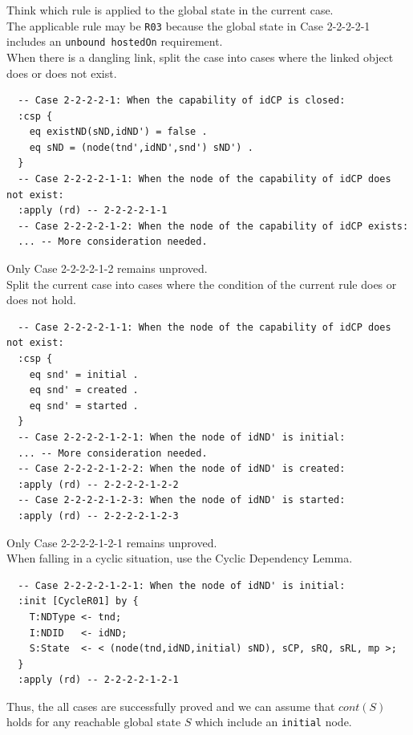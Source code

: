 \documentclass[12pt]{report}
\begin{document}
 Think which rule is applied to the 
global state in the current case. \\
The applicable rule may be {\tt R03} because the global state in Case
2-2-2-2-1 includes an {\tt unbound hostedOn} requirement.\\

 When there is a dangling link, split the case
into cases where the linked object does or does not exist.
\small
\begin{verbatim}
  -- Case 2-2-2-2-1: When the capability of idCP is closed:
  :csp {
    eq existND(sND,idND') = false .
    eq sND = (node(tnd',idND',snd') sND') .
  }
  -- Case 2-2-2-2-1-1: When the node of the capability of idCP does not exist:
  :apply (rd) -- 2-2-2-2-1-1
  -- Case 2-2-2-2-1-2: When the node of the capability of idCP exists:
  ... -- More consideration needed.
\end{verbatim}
\normalsize
Only Case 2-2-2-2-1-2 remains unproved.\\

 Split the current case into cases where
the condition of the current rule does or does not hold.
\small
\begin{verbatim}
  -- Case 2-2-2-2-1-1: When the node of the capability of idCP does not exist:
  :csp {
    eq snd' = initial .
    eq snd' = created .
    eq snd' = started .
  }
  -- Case 2-2-2-2-1-2-1: When the node of idND' is initial:
  ... -- More consideration needed.
  -- Case 2-2-2-2-1-2-2: When the node of idND' is created:
  :apply (rd) -- 2-2-2-2-1-2-2
  -- Case 2-2-2-2-1-2-3: When the node of idND' is started:
  :apply (rd) -- 2-2-2-2-1-2-3
\end{verbatim}
\normalsize
Only Case 2-2-2-2-1-2-1 remains unproved.\\

 When falling in a cyclic situation, use the
Cyclic Dependency Lemma. 
\small
\begin{verbatim}
  -- Case 2-2-2-2-1-2-1: When the node of idND' is initial:
  :init [CycleR01] by {
    T:NDType <- tnd;
    I:NDID   <- idND;
    S:State  <- < (node(tnd,idND,initial) sND), sCP, sRQ, sRL, mp >;
  }
  :apply (rd) -- 2-2-2-2-1-2-1
\end{verbatim}
\normalsize
Thus, the all cases are successfully proved and we can assume that $cont(S)$
holds for any reachable global state $S$ which include an {\tt initial} node.
\end{document}
